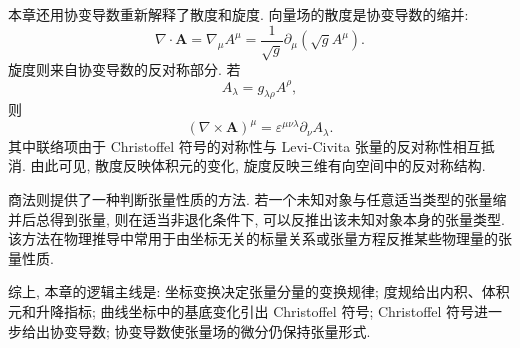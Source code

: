 本章还用协变导数重新解释了散度和旋度. 向量场的散度是协变导数的缩并: 
\[
\nabla\cdot\bm{A}
=
\nabla_{\mu}A^{\mu}
=
\frac{1}{\sqrt{g}}\partial_{\mu}(\sqrt{g}A^{\mu}).
\]
旋度则来自协变导数的反对称部分. 若
\[
A_{\lambda}=g_{\lambda\rho}A^{\rho},
\]
则
\[
(\nabla\times\bm{A})^{\mu}
=
\varepsilon^{\mu\nu\lambda}\partial_{\nu}A_{\lambda}.
\]
其中联络项由于 Christoffel 符号的对称性与 Levi-Civita 张量的反对称性相互抵消. 由此可见, 散度反映体积元的变化, 旋度反映三维有向空间中的反对称结构. 

商法则提供了一种判断张量性质的方法. 若一个未知对象与任意适当类型的张量缩并后总得到张量, 则在适当非退化条件下, 可以反推出该未知对象本身的张量类型. 该方法在物理推导中常用于由坐标无关的标量关系或张量方程反推某些物理量的张量性质. 

综上, 本章的逻辑主线是: 坐标变换决定张量分量的变换规律; 度规给出内积、体积元和升降指标; 曲线坐标中的基底变化引出 Christoffel 符号; Christoffel 符号进一步给出协变导数; 协变导数使张量场的微分仍保持张量形式. 